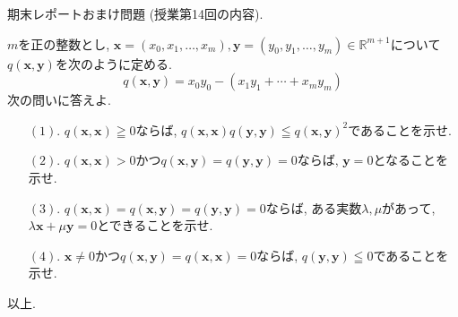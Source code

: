 \documentclass[dvipdfmx,a4paper,11pt]{article}
\newcommand{\R}{\mathbb{R}}
\theoremstyle{definition}
\begin{document}
\vspace{33pt} 
  

 
{\Large 期末レポートおまけ問題}  (授業第14回の内容).
\vspace{11pt}

$m$を正の整数とし, $\bm{x} = (x_0, x_1, \ldots, x_m), \bm{y} = (y_0, y_1, \ldots, y_m)\in \R^{m+1}$について$q(\bm{x},\bm{y})$を次のように定める. 
$$
q(\bm{x},\bm{y}) = x_0 y_0 - (x_1y_1 + \cdots + x_m y_m) 
$$
次の問いに答えよ.
\begin{enumerate}
 \setlength{\parskip}{0cm} %
  \setlength{\itemsep}{0cm}
\item[$(1).$] $q(\bm{x} , \bm{x} )\geqq 0$ならば, $q(\bm{x} , \bm{x})q(\bm{y} , \bm{y}) \leqq q(\bm{x},\bm{y})^2$であることを示せ.
\item[$(2).$] $q(\bm{x} ,\bm{x})>0$かつ$q(\bm{x},\bm{y})=q(\bm{y},\bm{y})=0$ならば, $\bm{y}=0$となることを示せ.
\item[$(3).$] $q(\bm{x},\bm{x})=q(\bm{x},\bm{y})=q(\bm{y},\bm{y})=0$ならば, ある実数$\lambda, \mu$があって, $\lambda \bm{x} + \mu \bm{y}=0$とできることを示せ.
\item[$(4).$] $\bm{x} \neq 0$かつ$q(\bm{x} ,\bm{y})=q(\bm{x},\bm{x})=0$ならば, $q(\bm{y} , \bm{y}) \leqq 0$であることを示せ.
\end{enumerate}

 \vspace{33pt} 
 
 

 
 
     
 \begin{flushright}
 {\LARGE 以上.}
 \end{flushright}



 
\end{document}
